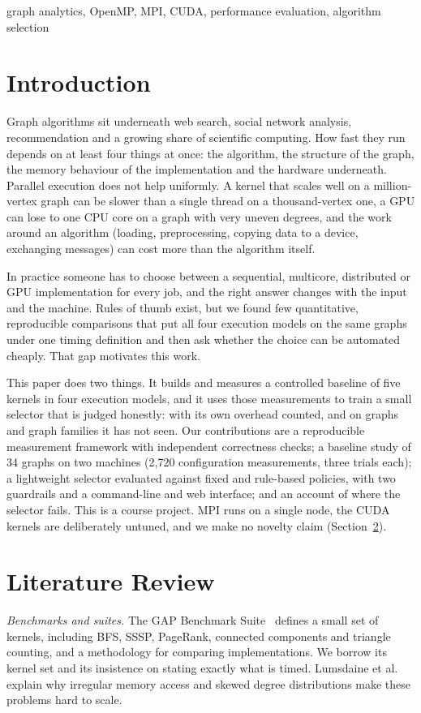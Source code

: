 \documentclass[conference]{IEEEtran}
\begin{document}
\begin{IEEEkeywords}
graph analytics, OpenMP, MPI, CUDA, performance evaluation, algorithm selection
\end{IEEEkeywords}

\section{Introduction}
Graph algorithms sit underneath web search, social network analysis, recommendation and a growing share of scientific computing. How fast they run depends on at least four things at once: the algorithm, the structure of the graph, the memory behaviour of the implementation and the hardware underneath. Parallel execution does not help uniformly. A kernel that scales well on a million-vertex graph can be slower than a single thread on a thousand-vertex one, a GPU can lose to one CPU core on a graph with very uneven degrees, and the work around an algorithm (loading, preprocessing, copying data to a device, exchanging messages) can cost more than the algorithm itself.

In practice someone has to choose between a sequential, multicore, distributed or GPU implementation for every job, and the right answer changes with the input and the machine. Rules of thumb exist, but we found few quantitative, reproducible comparisons that put all four execution models on the same graphs under one timing definition and then ask whether the choice can be automated cheaply. That gap motivates this work.

This paper does two things. It builds and measures a controlled baseline of five kernels in four execution models, and it uses those measurements to train a small selector that is judged honestly: with its own overhead counted, and on graphs and graph families it has not seen. Our contributions are a reproducible measurement framework with independent correctness checks; a baseline study of 34 graphs on two machines (2,720 configuration measurements, three trials each); a lightweight selector evaluated against fixed and rule-based policies, with two guardrails and a command-line and web interface; and an account of where the selector fails. This is a course project. MPI runs on a single node, the CUDA kernels are deliberately untuned, and we make no novelty claim (Section~\ref{sec:related}).

\section{Literature Review}\label{sec:related}
\textit{Benchmarks and suites.} The GAP Benchmark Suite~\cite{gap} defines a small set of kernels, including BFS, SSSP, PageRank, connected components and triangle counting, and a methodology for comparing implementations. We borrow its kernel set and its insistence on stating exactly what is timed. Lumsdaine et al.~\cite{lumsdaine} explain why irregular memory access and skewed degree distributions make these problems hard to scale.
\end{document}
